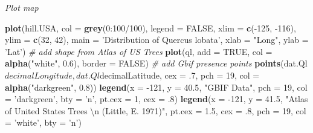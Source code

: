 \documentclass[author-year, review, 11pt]{components/elsarticle} %
\newenvironment{Shaded}{\begin{snugshade}}{\end{snugshade}}
\newcommand{\KeywordTok}[1]{\textcolor[rgb]{0.13,0.29,0.53}{\textbf{{#1}}}}
\newcommand{\DataTypeTok}[1]{\textcolor[rgb]{0.13,0.29,0.53}{{#1}}}
\newcommand{\DecValTok}[1]{\textcolor[rgb]{0.00,0.00,0.81}{{#1}}}
\newcommand{\FloatTok}[1]{\textcolor[rgb]{0.00,0.00,0.81}{{#1}}}
\newcommand{\CharTok}[1]{\textcolor[rgb]{0.31,0.60,0.02}{{#1}}}
\newcommand{\StringTok}[1]{\textcolor[rgb]{0.31,0.60,0.02}{{#1}}}
\newcommand{\CommentTok}[1]{\textcolor[rgb]{0.56,0.35,0.01}{\textit{{#1}}}}
\newcommand{\OtherTok}[1]{\textcolor[rgb]{0.56,0.35,0.01}{{#1}}}
\newcommand{\NormalTok}[1]{{#1}}
\begin{document}
\emph{Plot map}

\begin{Shaded}
\begin{Highlighting}[]
\KeywordTok{plot}\NormalTok{(hill.USA, }\DataTypeTok{col =} \KeywordTok{grey}\NormalTok{(}\DecValTok{0}\NormalTok{:}\DecValTok{100}\NormalTok{/}\DecValTok{100}\NormalTok{), }\DataTypeTok{legend =} \OtherTok{FALSE}\NormalTok{, }\DataTypeTok{xlim =} \KeywordTok{c}\NormalTok{(-}\DecValTok{125}\NormalTok{, -}\DecValTok{116}\NormalTok{), }\DataTypeTok{ylim =} \KeywordTok{c}\NormalTok{(}\DecValTok{32}\NormalTok{, }\DecValTok{42}\NormalTok{), }\DataTypeTok{main =} \StringTok{'Distribution of Quercus lobata'}\NormalTok{, }\DataTypeTok{xlab =} \StringTok{"Long"}\NormalTok{, }\DataTypeTok{ylab =} \StringTok{'Lat'}\NormalTok{)}
\CommentTok{# add shape from Atlas of US Trees}
\KeywordTok{plot}\NormalTok{(ql, }\DataTypeTok{add =} \OtherTok{TRUE}\NormalTok{, }\DataTypeTok{col =} \KeywordTok{alpha}\NormalTok{(}\StringTok{"white"}\NormalTok{, }\FloatTok{0.6}\NormalTok{), }\DataTypeTok{border =} \OtherTok{FALSE}\NormalTok{)}
\CommentTok{# add Gbif presence points}
\KeywordTok{points}\NormalTok{(dat.Ql$decimalLongitude, dat.Ql$decimalLatitude, }\DataTypeTok{cex =} \NormalTok{.}\DecValTok{7}\NormalTok{, }\DataTypeTok{pch =} \DecValTok{19}\NormalTok{, }\DataTypeTok{col =} \KeywordTok{alpha}\NormalTok{(}\StringTok{"darkgreen"}\NormalTok{, }\FloatTok{0.8}\NormalTok{))}
\KeywordTok{legend}\NormalTok{(}\DataTypeTok{x =} \NormalTok{-}\DecValTok{121}\NormalTok{, }\DataTypeTok{y =} \FloatTok{40.5}\NormalTok{, }\StringTok{"GBIF Data"}\NormalTok{, }\DataTypeTok{pch =} \DecValTok{19}\NormalTok{, }\DataTypeTok{col =} \StringTok{'darkgreen'}\NormalTok{, }\DataTypeTok{bty =} \StringTok{'n'}\NormalTok{, }\DataTypeTok{pt.cex =} \DecValTok{1}\NormalTok{, }\DataTypeTok{cex =} \NormalTok{.}\DecValTok{8}\NormalTok{)}
\KeywordTok{legend}\NormalTok{(}\DataTypeTok{x =} \NormalTok{-}\DecValTok{121}\NormalTok{, }\DataTypeTok{y =} \FloatTok{41.5}\NormalTok{, }\StringTok{"Atlas of United States Trees }\CharTok{\textbackslash{}n}\StringTok{ (Little, E. 1971)"}\NormalTok{, }\DataTypeTok{pt.cex =} \FloatTok{1.5}\NormalTok{, }\DataTypeTok{cex =} \NormalTok{.}\DecValTok{8}\NormalTok{, }\DataTypeTok{pch =} \DecValTok{19}\NormalTok{, }\DataTypeTok{col =} \StringTok{'white'}\NormalTok{, }\DataTypeTok{bty =} \StringTok{'n'}\NormalTok{)}
\end{Highlighting}
\end{Shaded}
\end{document}
